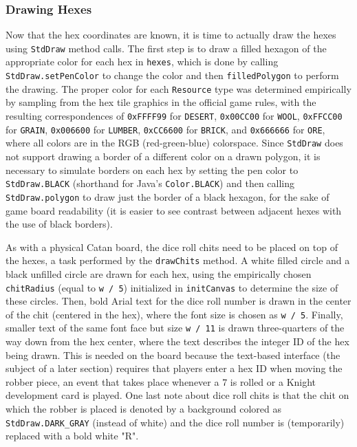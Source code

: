 \documentclass[pageno]{jpaper}
\begin{document}
\begin{doublespacing}
\hypertarget{sec:drawing_hexes}{}
\subsubsection{Drawing Hexes}

Now that the hex coordinates are known, it is time to actually draw the hexes using \lstinline$StdDraw$ method calls. The first step is to draw a filled hexagon of the appropriate color for each hex in \lstinline$hexes$, which is done by calling \lstinline$StdDraw.setPenColor$ to change the color and then \lstinline$filledPolygon$ to perform the drawing. The proper color for each \lstinline$Resource$ type was determined empirically by sampling from the hex tile graphics in the official game rules, with the resulting correspondences of \lstinline$0xFFFF99$ for \lstinline$DESERT$, \lstinline$0x00CC00$ for \lstinline$WOOL$, \lstinline$0xFFCC00$ for \lstinline$GRAIN$, \lstinline$0x006600$ for \lstinline$LUMBER$, \lstinline$0xCC6600$ for \lstinline$BRICK$, and \lstinline$0x666666$ for \lstinline$ORE$, where all colors are in the RGB (red-green-blue) colorspace. Since \lstinline$StdDraw$ does not support drawing a border of a different color on a drawn polygon, it is necessary to simulate borders on each hex by setting the pen color to \lstinline$StdDraw.BLACK$ (shorthand for Java's \lstinline$Color.BLACK$) and then calling \lstinline$StdDraw.polygon$ to draw just the border of a black hexagon, for the sake of game board readability (it is easier to see contrast between adjacent hexes with the use of black borders).

As with a physical Catan board, the dice roll chits need to be placed on top of the hexes, a task performed by the \lstinline$drawChits$ method. A white filled circle and a black unfilled circle are drawn for each hex, using the empirically chosen \lstinline$chitRadius$ (equal to \lstinline$w / 5$) initialized in \lstinline$initCanvas$ to determine the size of these circles. Then, bold Arial text for the dice roll number is drawn in the center of the chit (centered in the hex), where the font size is chosen as \lstinline$w / 5$. Finally, smaller text of the same font face but size \lstinline$w / 11$ is drawn three-quarters of the way down from the hex center, where the text describes the integer ID of the hex being drawn. This is needed on the board because the text-based interface (the subject of a later section) requires that players enter a hex ID when moving the robber piece, an event that takes place whenever a 7 is rolled or a Knight development card is played. One last note about dice roll chits is that the chit on which the robber is placed is denoted by a background colored as \lstinline$StdDraw.DARK_GRAY$ (instead of white) and the dice roll number is (temporarily) replaced with a bold white "R".


\end{doublespacing}
\end{document}
